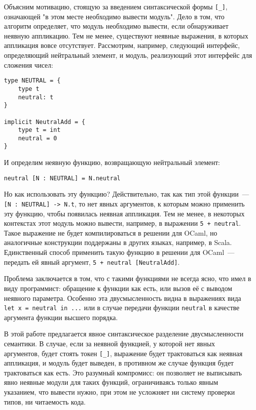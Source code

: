 \documentclass[../diploma.tex]{subfiles}
\begin{document}
Объясним мотивацию, стоящую за введением синтаксической формы \texttt{[_]}, означающей "в этом месте необходимо вывести модуль". Дело в том, что алгоритм определяет, что модуль необходимо вывести, если обнаруживает неявную аппликацию. Тем не менее, существуют неявные выражения, в которых аппликация вовсе отсутствует. Рассмотрим, например, следующий интерфейс, определяющий нейтральный элемент, и модуль, реализующий этот интерфейс для сложения чисел:

\begin{verbatim}
type NEUTRAL = {
    type t
    neutral: t
}

implicit NeutralAdd = {
    type t = int
    neutral = 0
}
\end{verbatim}

И определим неявную функцию, возвращающую нейтральный элемент:

\begin{verbatim}
neutral [N : NEUTRAL] = N.neutral
\end{verbatim}

Но как использовать эту функцию? Действительно, так как тип этой функции~--- \texttt{[N : NEUTRAL] -> N.t}, то нет явных аргументов, к которым можно применить эту функцию, чтобы появилась неявная аппликация. Тем не менее, в некоторых контекстах этот модуль можно вывести, например, в выражении \texttt{5 + neutral}. Такое выражение не будет компилироваться в решении для OCaml, но аналогичные конструкции поддержаны в других языках, например, в Scala. Единственный способ применить такую функцию в решении для OCaml~--- передать ей явный аргумент, \texttt{5 + neutral [NeutralAdd]}.

Проблема заключается в том, что с такими функциями не всегда ясно, что имел в виду программист: обращение к функции как есть, или вызов её с выводом неявного параметра. Особенно эта двусмысленность видна в выражениях вида \\\texttt{let x = neutral in ...} или в случае передачи функции \texttt{neutral} в качестве аргумента функции высшего порядка. 

В этой работе предлагается явное синтаксическое разделение двусмысленности семантики. В случае, если за неявной функцией, у которой нет явных аргументов, будет стоять токен \texttt{[_]}, выражение будет трактоваться как неявная аппликация, и модуль будет выведен, в противном же случае функция будет трактоваться как есть. Это разумный компромисс: он позволяет не выписывать явно неявные модули для таких функций, ограничиваясь только явным указанием, что вывести нужно, при этом не усложняет ни систему проверки типов, ни читаемость кода.
\end{document}
